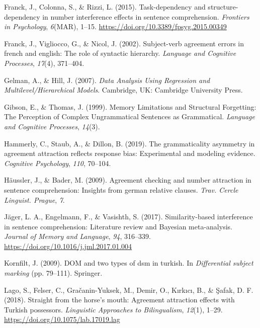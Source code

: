 \documentclass[
  english,
  doc,floatsintext]{apa6}
\newlength{\cslhangindent}
\newenvironment{cslreferences}%
  {\setlength{\parindent}{0pt}%
  \everypar{\setlength{\hangindent}{\cslhangindent}}\ignorespaces}%
  {\par}
\begin{document}
\begin{cslreferences}
\leavevmode\hypertarget{ref-FranckColonnaRizzi:2015}{}%
Franck, J., Colonna, S., \& Rizzi, L. (2015). Task-dependency and structure-dependency in number interference effects in sentence comprehension. \emph{Frontiers in Psychology}, \emph{6}(MAR), 1--15. \url{https://doi.org/10.3389/fpsyg.2015.00349}

\leavevmode\hypertarget{ref-FranckEtAl:2002}{}%
Franck, J., Vigliocco, G., \& Nicol, J. (2002). Subject-verb agreement errors in french and english: The role of syntactic hierarchy. \emph{Language and Cognitive Processes}, \emph{17}(4), 371--404.

\leavevmode\hypertarget{ref-GelmanHill2007}{}%
Gelman, A., \& Hill, J. (2007). \emph{Data Analysis Using Regression and Multilevel/Hierarchical Models}. Cambridge, UK: Cambridge University Press.

\leavevmode\hypertarget{ref-GibsonThomas:1999}{}%
Gibson, E., \& Thomas, J. (1999). Memory Limitations and Structural Forgetting: The Perception of Complex Ungrammatical Sentences as Grammatical. \emph{Language and Cognitive Processes}, \emph{14}(3).

\leavevmode\hypertarget{ref-HammerlyEtAl:2019}{}%
Hammerly, C., Staub, A., \& Dillon, B. (2019). The grammaticality asymmetry in agreement attraction reflects response bias: Experimental and modeling evidence. \emph{Cognitive Psychology}, \emph{110}, 70--104.

\leavevmode\hypertarget{ref-Haussler2009}{}%
Häussler, J., \& Bader, M. (2009). Agreement checking and number attraction in sentence comprehension: Insights from german relative clauses. \emph{Trav. Cercle Linguist. Prague}, \emph{7}.

\leavevmode\hypertarget{ref-JagerEngelmannVasishth:2017}{}%
Jäger, L. A., Engelmann, F., \& Vasishth, S. (2017). Similarity-based interference in sentence comprehension: Literature review and Bayesian meta-analysis. \emph{Journal of Memory and Language}, \emph{94}, 316--339. \url{https://doi.org/10.1016/j.jml.2017.01.004}

\leavevmode\hypertarget{ref-kornfilt2009dom}{}%
Kornfilt, J. (2009). DOM and two types of dsm in turkish. In \emph{Differential subject marking} (pp. 79--111). Springer.

\leavevmode\hypertarget{ref-LagoEtAl2018}{}%
Lago, S., Felser, C., Gračanin-Yuksek, M., Demir, O., Kırkıcı, B., \& Şafak, D. F. (2018). Straight from the horse's mouth: Agreement attraction effects with Turkish possessors. \emph{Linguistic Approaches to Bilingualism}, \emph{12}(1), 1--29. \url{https://doi.org/10.1075/lab.17019.lag}


\end{cslreferences}
\end{document}
